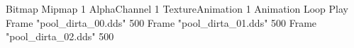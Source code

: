 {Bitmap
	{Mipmap 1}
	{AlphaChannel 1}
	{TextureAnimation 1}
	{Animation Loop Play}
	{Frame "pool_dirta_00.dds"	500}
	{Frame "pool_dirta_01.dds"	500}
	{Frame "pool_dirta_02.dds"	500}
}
